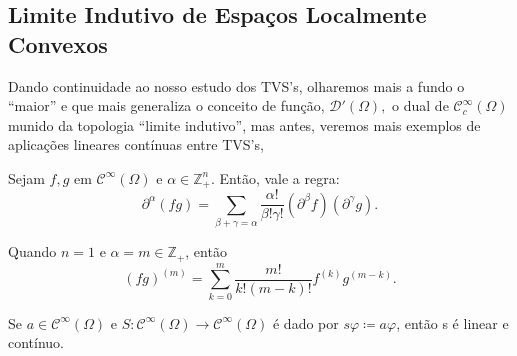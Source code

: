 \documentclass[../distribution_theory_notes.tex]{subfiles}
\begin{document}
    \subsection{Limite Indutivo de Espaços Localmente Convexos}
    Dando continuidade ao nosso estudo dos TVS's, olharemos mais a fundo o ``maior'' e que mais generaliza o conceito de função, \(\mathcal{D}'(\Omega ),\) o dual de \(\mathcal{C}_{c}^{\infty}(\Omega )\) munido da topologia ``limite indutivo'', mas antes, veremos mais exemplos de aplicações lineares contínuas entre TVS's,
   \begin{lemma*}
     Sejam \(f, g\) em \(\mathcal{C}^{\infty}(\Omega )\) e \(\alpha \in \mathbb{Z}_{+}^{n}\). Então, vale a regra: 
       \[
         \partial^{\alpha }(fg)=\sum\limits_{\beta+\gamma =\alpha }^{}\frac{\alpha!}{\beta!\gamma!}(\partial^{\beta }f)(\partial^{\gamma }g).
       \]
   \end{lemma*}
   Quando \(n=1\) e \(\alpha =m\in \mathbb{Z}_{+}\), então 
     \[
       (fg)^{(m)} = \sum\limits_{k=0}^{m}\frac{m!}{k!(m-k)!}f^{(k)}g^{(m-k)}.
     \]
    \begin{lemma*}
      Se \(a\in \mathcal{C}^{\infty}(\Omega )\) e \(S:\mathcal{C}^{\infty}(\Omega )\rightarrow \mathcal{C}^{\infty}(\Omega )\) é dado por \(s\varphi\coloneqq a \varphi \), então s é linear e contínuo.
    \end{lemma*}
    
\end{document}
